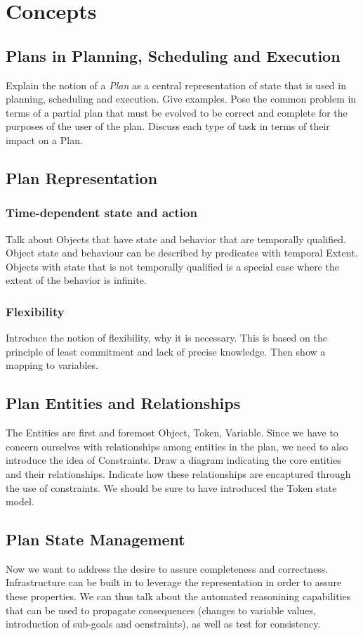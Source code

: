 \documentclass[10pt, letterpaper, twoside]{article}
\begin{document}
\section{Concepts}
\subsection{Plans in Planning, Scheduling and Execution}
Explain the notion of a {\em Plan} as a central representation of
state that is used in planning, scheduling and execution. Give
examples. Pose the common problem in terms of a partial plan that must
be evolved to be correct and complete for the purposes of the user of
the plan. Discuss each type of task in terms of their impact on a
Plan.
\subsection{Plan Representation}
\subsubsection{Time-dependent state and action}
Talk about Objects that have state and behavior that are temporally
qualified. Object state and behaviour can be described by predicates
with temporal Extent. Objects with state that is not temporally
qualified is a special case where the extent of the behavior is
infinite.
\subsubsection{Flexibility}
Introduce the notion of flexibility, why it is necessary. This is
based on the principle of least commitment and lack of precise
knowledge. Then show a mapping to variables.
\subsection{Plan Entities and Relationships}
The Entities are first and foremost Object, Token, Variable. Since we
have to concern ourselves with relationships among entities in the
plan, we need to also introduce the idea of Constraints. Draw a
diagram indicating the core entities and their relationships. Indicate
how these relationships are encaptured through the use of
constraints. We should be sure to have introduced the Token state
model.
\subsection{Plan State Management}
Now we want to address the desire to assure completeness and
correctness. Infrastructure can be built in to leverage the
representation in order to assure these properties. We can thus talk
about the automated reasonining capabilities that can be used to
propagate consequences (changes to variable values, introduction of
sub-goals and ocnstraints), as well as test for consistency.
\end{document}
